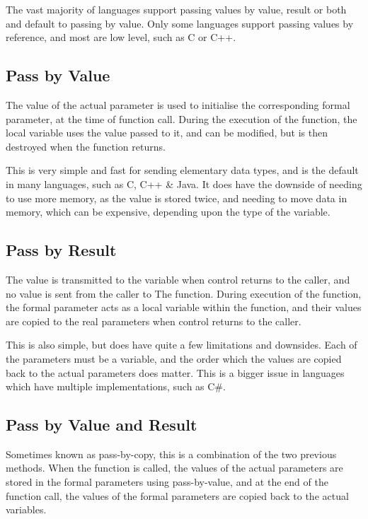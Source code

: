 The vast majority of languages support passing values by value, result or both and default to passing by value. Only
 some languages support passing values by reference, and most are low level, such as C or C++.

\subsection*{Pass by Value}

The value of the actual parameter is used to initialise the corresponding formal parameter, at the time of function call.
 During the execution of the function, the local variable uses the value passed to it, and can be modified, but is then
 destroyed when the function returns.

This is very simple and fast for sending elementary data types, and is the default in many languages, such as C, C++ \&
 Java. It does have the downside of needing to use more memory, as the value is stored twice, and needing to move data
 in memory, which can be expensive, depending upon the type of the variable.

\subsection*{Pass by Result}

The value is transmitted to the variable when control returns to the caller, and no value is sent from the caller to The
 function. During execution of the function, the formal parameter acts as a local variable within the function, and
 their values are copied to the real parameters when control returns to the caller.

This is also simple, but does have quite a few limitations and downsides. Each of the parameters must be a variable, and
 the order which the values are copied back to the actual parameters does matter. This is a bigger issue in languages
 which have multiple implementations, such as C\#.

\subsection*{Pass by Value and Result}

Sometimes known as pass-by-copy, this is a combination of the two previous methods. When the function is called, the
 values of the actual parameters are stored in the formal parameters using pass-by-value, and at the end of the function
 call, the values of the formal parameters are copied back to the actual variables.

